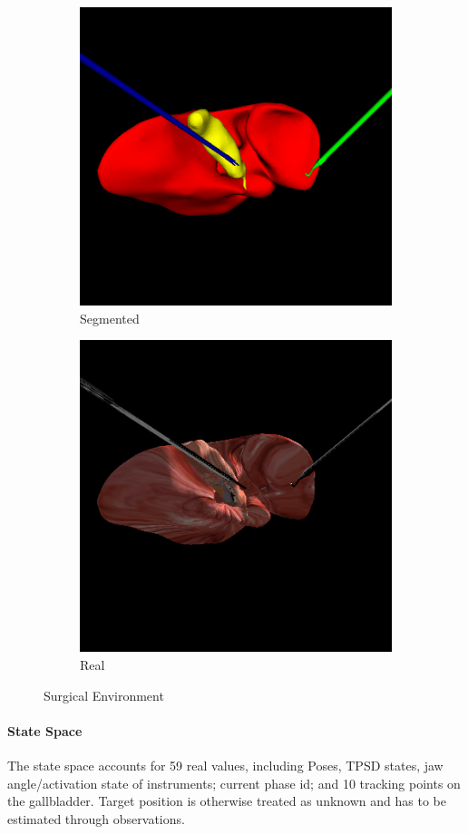 \begin{figure}[H]
    \centering
    \begin{subfigure}{0.45\textwidth}
        \centering
        \includegraphics[width=0.75\linewidth]{images/grasplifttouch.png}
        \caption{Segmented}
    \end{subfigure}
    \hfill
    \begin{subfigure}{0.45\textwidth}
        \centering
        \includegraphics[width=0.72\linewidth]{images/grasplifttouch_real.png}
        \caption{Real}
    \end{subfigure}
    \caption{Surgical Environment}
    \label{fig:surgicaltask}
\end{figure}



\paragraph{State Space}
The state space accounts for 59 real values, including Poses, TPSD states, 
jaw angle/activation state of instruments; current phase id; 
and 10 tracking points on the gallbladder. Target position is otherwise treated as 
unknown and has to be estimated through observations.

